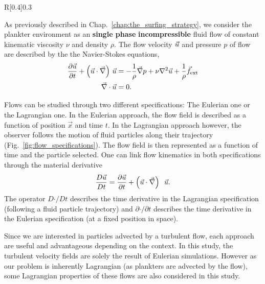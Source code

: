 \begin{wrapfigure}[16]{R}[0.4\width]{0.3\textwidth}
	\centering
	\vspace{-25pt}
	\def\svgwidth{0.25\textwidth}
	
	\captionsetup{width=0.25\textwidth}
  	\caption{
  		Illustration of the differences of Eulerian and Lagrangian specification.
  	}
  	\label{fig:flow_specifications}
\end{wrapfigure}
As previously described in Chap.~\ref{chap:the_surfing_strategy}, we consider the plankter environment as an \textbf{single phase} \textbf{incompressible} fluid flow of constant kinematic viscosity $\nu$ and density $\rho$.
The flow velocity $\vec{u}$ and pressure $p$ of flow are described by the the Navier-Stokes equations,
\begin{subequations}\label{turb:eq:navier_stokes}
	\begin{align}
		\frac{\partial \vec{u}}{\partial t} + \left( \vec{u} \cdot \vec{\nabla} \right) \, \vec{u} & =
		- \frac{1}{\rho} \vec{\nabla} p + \nu \nabla^2 \vec{u} + \frac{1}{\rho} \vec{f}_{\mathrm{ext}}\label{turb:eq:navier_stokes_momentum} \\
		\vec{\nabla} \cdot \vec{u} & = 0.\label{turb:eq:navier_stokes_mass}
	\end{align}
\end{subequations}

Flows can be studied through two different specifications: The Eulerian one or the Lagrangian one.
In the Eulerian approach, the flow field is described as a function of position $\vec{x}$ and time $t$. 
In the Lagrangian approach however, the observer follows the motion of fluid particles along their trajectory (Fig.~\ref{fig:flow_specifications}).
The flow field is then represented as a function of time and the particle selected.
One can link flow kinematics in both specifications through the material derivative
\begin{equation}
	\frac{D \vec{u}}{D t} = \frac{\partial \vec{u}}{\partial t} + \left( \vec{u} \cdot \vec{\nabla} \right)\ \, \vec{u}.
\end{equation}
The operator $D \mathord{\cdot} / D t$ describes the time derivative in the Lagrangian specification (following a fluid particle trajectory) and $\partial \mathord{\cdot} / \partial t$ describes the time derivative in the Eulerian specification (at a fixed position in space).

Since we are interested in particles advected by a turbulent flow, each approach are useful and advantageous depending on the context.
In this study, the turbulent velocity fields are solely the result of Eulerian simulations.
However as our problem is inherently Lagrangian (as plankters are advected by the flow), some Lagrangian properties of these flows are also considered in this study.

